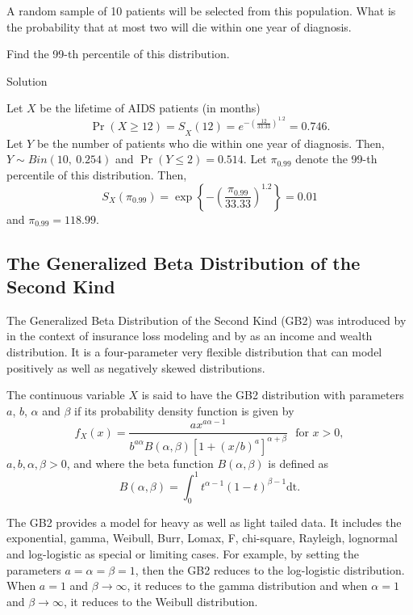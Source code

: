 \documentclass[]{book}
\theoremstyle{definition}
\theoremstyle{definition}
\theoremstyle{definition}
\theoremstyle{remark}
\begin{document}
A random sample of 10 patients will be selected from this population.
What is the probability that at most two will die within one year of
diagnosis.

Find the 99-th percentile of this distribution.

Solution

Let \(X\) be the lifetime of AIDS patients (in months)
\[{\Pr\left( X \geq 12 \right) = S}_{X}\left( 12 \right) = e^{- \left( \frac{12}{33.33} \right)^{1.2}} = 0.746.\]
Let \(Y\) be the number of patients who die within one year of
diagnosis. Then, \(Y\sim Bin\left( 10,\ 0.254 \right)\) and
\(\Pr\left( Y \leq 2 \right) = 0.514.\) Let \(\pi_{0.99}\) denote the
99-th percentile of this distribution. Then,
\[S_{X}\left( \pi_{0.99} \right) = \exp\left\{- \left( \frac{\pi_{0.99}}{33.33} \right)^{1.2}\right\} = 0.01\]
and \(\pi_{0.99} = 118.99\).

\subsection{The Generalized Beta Distribution of the Second
Kind}\label{the-generalized-beta-distribution-of-the-second-kind}

The Generalized Beta Distribution of the Second Kind (GB2) was
introduced by \citet{venter1983transformed} in the context of insurance
loss modeling and by \citet{mcdonald1984some} as an income and wealth
distribution. It is a four-parameter very flexible distribution that can
model positively as well as negatively skewed distributions.

The continuous variable \(X\) is said to have the GB2 distribution with
parameters \(a\), \(b\), \(\alpha\) and \(\beta\) if its probability
density function is given by
\[f_{X}\left( x \right) = \frac{ax^{a \alpha - 1}}{b^{a \alpha}B\left( \alpha,\beta \right)\left\lbrack 1 + \left( x/b \right)^{a} \right\rbrack^{\alpha + \beta}} \ \ \ \text{for } x > 0,\]
\(a,b,\alpha,\beta > 0\), and where the beta function
\(B\left( \alpha,\beta \right)\) is defined as
\[B\left( \alpha,\beta \right) = \int_{0}^{1}{t^{\alpha - 1}\left( 1 - t \right)^{\beta - 1}}\text{dt}.\]

The GB2 provides a model for heavy as well as light tailed data. It
includes the exponential, gamma, Weibull, Burr, Lomax, F, chi-square,
Rayleigh, lognormal and log-logistic as special or limiting cases. For
example, by setting the parameters \(a = \alpha = \beta = 1\), then the
GB2 reduces to the log-logistic distribution. When \(a = 1\) and
\(\beta \rightarrow \infty\), it reduces to the gamma distribution and
when \(\alpha = 1\) and \(\beta \rightarrow \infty\), it reduces to the
Weibull distribution.
\end{document}
